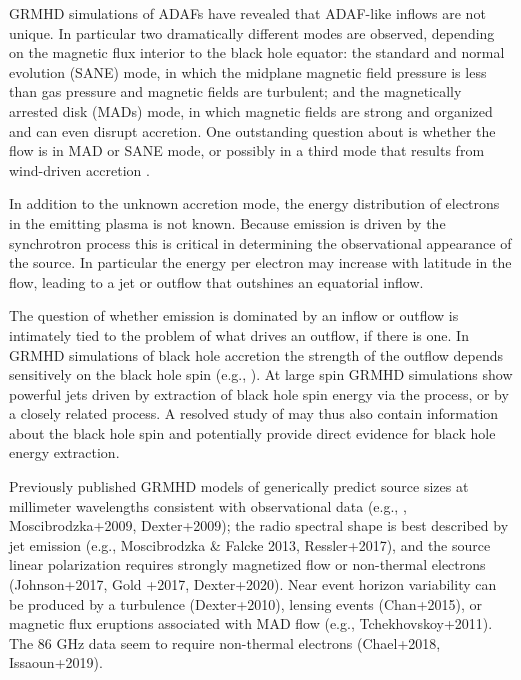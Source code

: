 GRMHD simulations of ADAFs have revealed that ADAF-like inflows are not unique. In particular two dramatically different modes are observed, depending on the magnetic flux interior to the black hole equator: the standard and normal evolution (SANE) mode, in which the midplane magnetic field pressure is less than gas pressure and magnetic fields are turbulent; and the magnetically arrested disk (MADs) mode, in which magnetic fields are strong and organized and can even disrupt accretion.  One outstanding question about \sgra is whether the flow is in MAD or SANE mode, or possibly in a third mode that results from wind-driven accretion \citep{2020ApJ...896L...6R}.

In addition to the unknown accretion mode, the energy distribution of electrons in the emitting plasma is not known.  Because emission is driven by the synchrotron process this is critical in determining the observational appearance of the source.  In particular the energy per electron may increase with latitude in the flow, leading to a jet or outflow that outshines an equatorial inflow.

The question of whether emission is dominated by an inflow or outflow is intimately tied to the problem of what drives an outflow, if there is one.  In GRMHD simulations of black hole accretion the strength of the outflow depends sensitively on the black hole spin (e.g., ).  At large spin GRMHD simulations show powerful jets driven by extraction of black hole spin energy via the \cite{1977MNRAS.179..433B} process, or by a closely related process.  A resolved study of \sgra may thus also contain information about the black hole spin and potentially provide direct evidence for black hole energy extraction.


Previously published GRMHD models of \sgra generically predict source sizes at millimeter wavelengths consistent with observational data (e.g., \citealt{2008Natur.455...78D}, Moscibrodzka+2009, Dexter+2009);
the radio spectral shape is best described by jet emission (e.g., Moscibrodzka \& Falcke 2013, Ressler+2017), and the source linear polarization requires strongly magnetized flow or non-thermal electrons (Johnson+2017, Gold +2017, Dexter+2020). Near event horizon variability can be produced by a turbulence (Dexter+2010), lensing events (Chan+2015), or magnetic flux eruptions associated with MAD flow (e.g., Tchekhovskoy+2011). The 86 GHz data seem to require non-thermal electrons (Chael+2018, Issaoun+2019).

